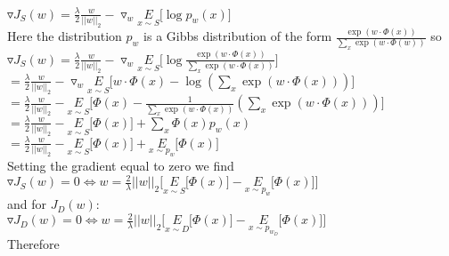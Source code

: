 \documentclass[]{article}
\begin{document}
$\triangledown J_S(w) = \frac{\lambda}{2} \frac{w}{\vert \vert w \vert \vert_2} - \triangledown_w \underset{x \sim S}{E}\lbrack \log p_w(x) \rbrack$\\

\noindent Here the distribution $p_w$ is a Gibbs distribution of the form $\frac{\exp(w \cdot \Phi(x))}{\underset{x}{\sum} \exp(w \cdot \Phi(w))}$ so\\

$\triangledown J_S(w) = \frac{\lambda}{2} \frac{w}{\vert \vert w \vert \vert_2} - \triangledown_w \underset{x \sim S}{E}\lbrack \log \frac{\exp(w \cdot \Phi(x))}{\underset{x}{\sum} \exp(w \cdot \Phi(x))} \rbrack$\\

$= \frac{\lambda}{2} \frac{w}{\vert \vert w \vert \vert_2} - \triangledown_w  \underset{x \sim S}{E} \lbrack w \cdot \Phi(x) - \log(\underset{x}{\sum} \exp(w \cdot \Phi(x)))\rbrack$\\

$= \frac{\lambda}{2} \frac{w}{\vert \vert w \vert \vert_2} -  \underset{x \sim S}{E} \lbrack \Phi(x) - \frac{1}{\underset{x}{\sum} \exp(w \cdot \Phi(x))}(\underset{x}{\sum} \exp(w \cdot \Phi(x)))\rbrack$\\

$= \frac{\lambda}{2} \frac{w}{\vert \vert w \vert \vert_2} -  \underset{x \sim S}{E} \lbrack \Phi(x) \rbrack + \underset{x}{\sum} \Phi(x)p_w(x)$\\

$= \frac{\lambda}{2} \frac{w}{\vert \vert w \vert \vert_2} - \underset{x \sim S}{E} \lbrack \Phi(x) \rbrack +  \underset{x \sim p_w}{E} \lbrack \Phi(x) \rbrack$\\

\noindent Setting the gradient equal to zero we find\\

$\triangledown J_S(w) = 0 \iff w = \frac{2}{\lambda} \vert \vert w \vert \vert_2 \lbrack \underset{x \sim S}{E} \lbrack \Phi(x) \rbrack - \underset{x \sim p_w}{E} \lbrack \Phi(x) \rbrack \rbrack$\\

\noindent and for $J_D(w)$:\\

$\triangledown J_D(w) = 0 \iff w = \frac{2}{\lambda} \vert \vert w \vert \vert_2 \lbrack \underset{x \sim D}{E} \lbrack \Phi(x) \rbrack - \underset{x \sim p_{w_D}}{E} \lbrack \Phi(x) \rbrack \rbrack$\\

\noindent Therefore\\
\end{document}
